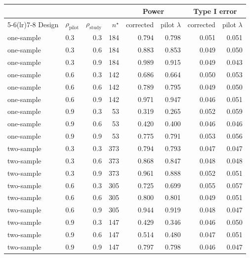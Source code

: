 \begin{tabular}{llrrrrrr}
\toprule
 & & & & \multicolumn{2}{c}{Power} & \multicolumn{2}{c}{Type I error} \\
\cmidrule(lr){5-6}\cmidrule(lr){7-8}
Design & $\rho_{\mathrm{pilot}}$ & $\rho_{\mathrm{study}}$ & $n^\star$ & corrected & pilot $\lambda$ & corrected & pilot $\lambda$ \\
\midrule
one-sample & 0.3 & 0.3 & 184 & 0.794 & 0.798 & 0.051 & 0.051 \\
one-sample & 0.3 & 0.6 & 184 & 0.883 & 0.853 & 0.049 & 0.050 \\
one-sample & 0.3 & 0.9 & 184 & 0.989 & 0.915 & 0.049 & 0.043 \\
one-sample & 0.6 & 0.3 & 142 & 0.686 & 0.664 & 0.050 & 0.053 \\
one-sample & 0.6 & 0.6 & 142 & 0.789 & 0.795 & 0.049 & 0.050 \\
one-sample & 0.6 & 0.9 & 142 & 0.971 & 0.947 & 0.046 & 0.051 \\
one-sample & 0.9 & 0.3 & 53 & 0.319 & 0.265 & 0.052 & 0.059 \\
one-sample & 0.9 & 0.6 & 53 & 0.420 & 0.400 & 0.046 & 0.046 \\
one-sample & 0.9 & 0.9 & 53 & 0.775 & 0.791 & 0.053 & 0.056 \\
two-sample & 0.3 & 0.3 & 373 & 0.794 & 0.793 & 0.047 & 0.047 \\
two-sample & 0.3 & 0.6 & 373 & 0.868 & 0.847 & 0.048 & 0.048 \\
two-sample & 0.3 & 0.9 & 373 & 0.961 & 0.888 & 0.052 & 0.051 \\
two-sample & 0.6 & 0.3 & 305 & 0.725 & 0.699 & 0.055 & 0.057 \\
two-sample & 0.6 & 0.6 & 305 & 0.800 & 0.801 & 0.049 & 0.051 \\
two-sample & 0.6 & 0.9 & 305 & 0.944 & 0.919 & 0.048 & 0.047 \\
two-sample & 0.9 & 0.3 & 147 & 0.429 & 0.346 & 0.046 & 0.050 \\
two-sample & 0.9 & 0.6 & 147 & 0.514 & 0.480 & 0.047 & 0.051 \\
two-sample & 0.9 & 0.9 & 147 & 0.797 & 0.798 & 0.046 & 0.047 \\
\bottomrule
\end{tabular}

